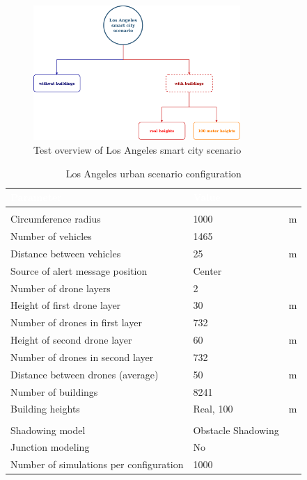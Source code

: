 		\begin{figure}[H]
			\centering
			\includegraphics[width=0.7\textwidth]{immagini/la-smart-city/overview}
			\caption{Test overview of Los Angeles smart city scenario}
			\label{fig:la-smart-city-overview}
		\end{figure}
		
	\begin{table}[H]
		\def\arraystretch{1.1}
		\begin{tabularx}{\textwidth}{l | l  l}
			\rowcolor{I} {\large \textcolor{white}{Parameter}} & {\large \textcolor{white}{Value}} & {\large \textcolor{white}{}} \TBstrut  \\
			\toprule
			\endhead
			\rowcolor{P} \multicolumn{3}{c}{Scenario configuration} \\
			\midrule[1pt]
			Circumference radius					& 1000					& m		\\
			Number of vehicles						& 1465					& 		\\
			Distance between vehicles 				& 25					& m		\\
			Source of alert message position		& Center				&		\\
			Number of drone layers					& 2						&		\\
			Height of first drone layer				& 30					& m		\\
			Number of drones in first layer			& 732					& 		\\
			Height of second drone layer			& 60					& m		\\
			Number of drones in second layer		& 732					& 		\\
			Distance between drones (average)		& 50					& m		\\
			Number of buildings						& 8241					&		\\
			Building heights						& Real, 100				& m		\\
			\midrule[1pt]
			\rowcolor{P} \multicolumn{3}{c}{Simulator configuration} \\
			\midrule[1pt]
			Shadowing model							& Obstacle Shadowing 	&		\\
			Junction modeling						& No					&		\\
			\midrule[1pt]
			Number of simulations per configuration	& 1000					&		\\
			\bottomrule
		\end{tabularx}
		\caption{Los Angeles urban scenario configuration}
		\label{tab:la-smart-city}
	\end{table}

